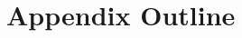 \documentclass{article} %
\begin{document}




\clearpage
\newpage
\appendix
\maketitle

\section{Appendix Outline}
\begin{itemize}

\end{itemize}
\end{document}
